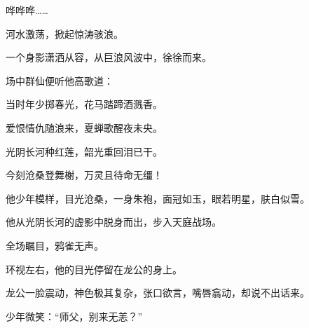 \begin{this_body}
哗哗哗……

河水激荡，掀起惊涛骇浪。

一个身影潇洒从容，从巨浪风波中，徐徐而来。

场中群仙便听他高歌道：

当时年少掷春光，花马踏蹄酒溅香。

爱恨情仇随浪来，夏蝉歌醒夜未央。

光阴长河种红莲，韶光重回泪已干。

今刻沧桑登舞榭，万灵且待命无缰！

他少年模样，目光沧桑，一身朱袍，面冠如玉，眼若明星，肤白似雪。

他从光阴长河的虚影中脱身而出，步入天庭战场。

全场瞩目，鸦雀无声。

环视左右，他的目光停留在龙公的身上。

龙公一脸震动，神色极其复杂，张口欲言，嘴唇翕动，却说不出话来。

少年微笑：“师父，别来无恙？”

\end{this_body}

